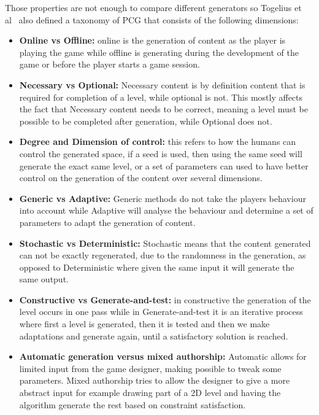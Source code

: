 \documentclass[runningheads]{llncs}
\begin{document}
Those properties are not enough to compare different generators so Togelius et al~\cite{ref_togelius} also defined a taxonomy of PCG that consists of the following dimensions:
\begin{itemize}
    \item\textbf{Online vs Offline:} online is the generation of content as the player is playing the game while offline is generating during the development of the game or before the player starts a game session. 
    
    \item\textbf{Necessary vs Optional:} Necessary content is by definition content that is required for completion of a level, while optional is not. This mostly affects the fact that Necessary content needs to be correct, meaning a level must be possible to be completed after generation, while Optional does not. 
    
    \item\textbf{Degree and Dimension of control:} this refers to how the humans can control the generated space, if a seed is used, then using the same seed will generate the exact same level, or a set of parameters can used to have better control on the generation of the content over several dimensions.%
    
    \item\textbf{Generic vs Adaptive:} Generic methods do not take the players behaviour into account while Adaptive will analyse the behaviour and determine a set of parameters to adapt the generation of content.
    
    \item\textbf{Stochastic vs Deterministic:} Stochastic means that the content generated can not be exactly regenerated, due to the randomness in the generation, as opposed to Deterministic where given the same input it will generate the same output.
    
    \item\textbf{Constructive vs Generate-and-test:} in constructive the generation of the level occurs in one pass while in Generate-and-test it is an iterative process where first a level is generated, then it is tested and then we make adaptations and generate again, until a satisfactory solution is reached.
    
    \item\textbf{Automatic generation versus mixed authorship:} Automatic allows for limited input from the game designer, making possible to tweak some parameters. Mixed authorship tries to allow the designer to give a more abstract input for example drawing part of a 2D level and having the algorithm generate the rest based on constraint satisfaction. 
\end{itemize}
\end{document}
